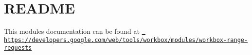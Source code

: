 \chapter{README}
\hypertarget{md_pkiclassroomrescheduler_2src_2main_2frontend_2node__modules_2workbox-range-requests_2_r_e_a_d_m_e}{}\label{md_pkiclassroomrescheduler_2src_2main_2frontend_2node__modules_2workbox-range-requests_2_r_e_a_d_m_e}
This module\textquotesingle{}s documentation can be found at \href{https://developers.google.com/web/tools/workbox/modules/workbox-range-requests}{\texttt{ https\+://developers.\+google.\+com/web/tools/workbox/modules/workbox-\/range-\/requests}} 